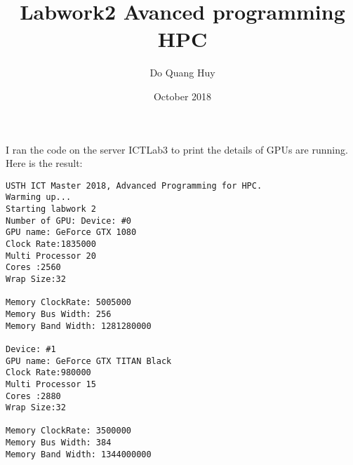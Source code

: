 \documentclass{article}
\title{Labwork2 Avanced programming HPC}
\author{Do Quang Huy}
\date{October 2018}
\begin{document}
\maketitle

I ran the code on the server ICTLab3 to print the details of GPUs are running. Here is the result:

\begin{verbatim}
USTH ICT Master 2018, Advanced Programming for HPC.
Warming up...
Starting labwork 2
Number of GPU: Device: #0 
GPU name: GeForce GTX 1080
Clock Rate:1835000
Multi Processor 20
Cores :2560
Wrap Size:32

Memory ClockRate: 5005000
Memory Bus Width: 256
Memory Band Width: 1281280000

Device: #1 
GPU name: GeForce GTX TITAN Black
Clock Rate:980000
Multi Processor 15
Cores :2880
Wrap Size:32

Memory ClockRate: 3500000
Memory Bus Width: 384
Memory Band Width: 1344000000

\end{verbatim}
\end{document}
